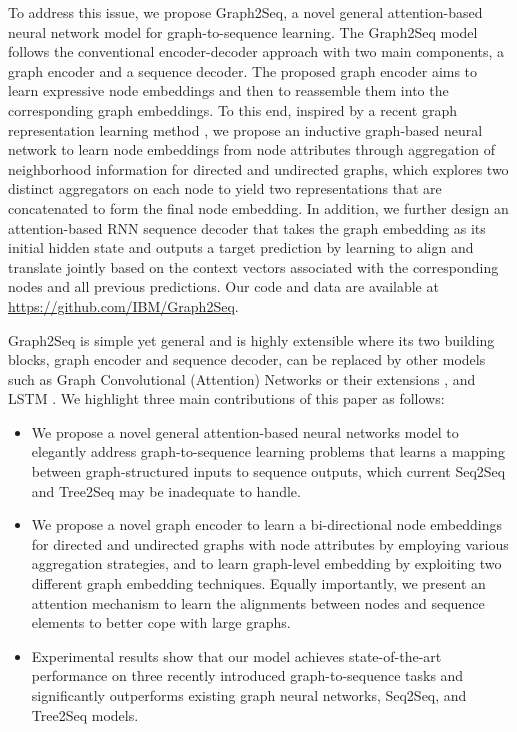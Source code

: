 \documentclass{article} \usepackage{iclr2019_conference,times}
\begin{document}
To address this issue, we propose Graph2Seq, a novel general attention-based neural network model for graph-to-sequence learning.
The Graph2Seq model follows the conventional encoder-decoder approach with two main components, a graph encoder and a sequence decoder. The proposed graph encoder aims to learn expressive node embeddings and then to reassemble them into the corresponding graph embeddings. To this end, inspired by a recent graph representation learning method \citep{hamilton2017inductive}, we propose an inductive graph-based neural network to learn node embeddings from node attributes through aggregation of neighborhood information for directed and undirected graphs, which explores two distinct aggregators on each node to yield two representations that are concatenated to form the final node embedding. In addition, we further design an attention-based RNN sequence decoder that takes the graph embedding as its initial hidden state and outputs a target prediction by learning to align and translate jointly based on the context vectors associated with the corresponding nodes and all previous predictions. Our code and data are available at {\small \url{https://github.com/IBM/Graph2Seq}}.

Graph2Seq is simple yet general and is highly extensible where its two building blocks, graph encoder and sequence decoder, can be replaced by other models such as Graph Convolutional (Attention) Networks \citep{kipf2016semi,velickovic2017graph} or their extensions \citep{schlichtkrull2017modeling}, and LSTM \citep{hochreiter1997long}. We highlight three main contributions of this paper as follows:
\begin{itemize}
\item We propose a novel general attention-based neural networks model to elegantly address graph-to-sequence learning problems that learns a mapping between graph-structured inputs to sequence outputs, which current Seq2Seq and Tree2Seq may be inadequate to handle. 
\item We propose a novel graph encoder to learn a bi-directional node embeddings for directed and undirected graphs with node attributes by employing various aggregation strategies, and to learn graph-level embedding by exploiting two different graph embedding techniques. Equally importantly, we present an attention mechanism to learn the alignments between nodes and sequence elements to better cope with large graphs.
\item Experimental results show that our model achieves state-of-the-art performance on three recently introduced graph-to-sequence tasks and significantly outperforms existing graph neural networks, Seq2Seq, and Tree2Seq models. 
\end{itemize}
\end{document}
